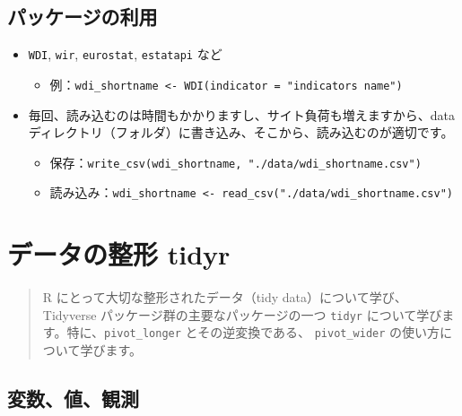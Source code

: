 \documentclass[
  xelatex, ja=standard]{bxjsbook}
\providecommand{\tightlist}{%
  \setlength{\itemsep}{0pt}\setlength{\parskip}{0pt}}
\theoremstyle{definition}
\theoremstyle{definition}
\theoremstyle{definition}
\theoremstyle{definition}
\theoremstyle{remark}
\begin{document}
\hypertarget{ux30d1ux30c3ux30b1ux30fcux30b8ux306eux5229ux7528}{%
\subsection{パッケージの利用}\label{ux30d1ux30c3ux30b1ux30fcux30b8ux306eux5229ux7528}}

\begin{itemize}
\tightlist
\item
  \texttt{WDI}, \texttt{wir}, \texttt{eurostat}, \texttt{estatapi} など

  \begin{itemize}
  \tightlist
  \item
    例：\texttt{wdi\_shortname\ \textless{}-\ WDI(indicator\ =\ "indicator\textquotesingle{}s\ name")}
  \end{itemize}
\item
  毎回、読み込むのは時間もかかりますし、サイト負荷も増えますから、data ディレクトリ（フォルダ）に書き込み、そこから、読み込むのが適切です。

  \begin{itemize}
  \tightlist
  \item
    保存：\texttt{write\_csv(wdi\_shortname,\ "./data/wdi\_shortname.csv")}
  \item
    読み込み：\texttt{wdi\_shortname\ \textless{}-\ read\_csv("./data/wdi\_shortname.csv")}
  \end{itemize}
\end{itemize}

\hypertarget{ux30c7ux30fcux30bfux306eux6574ux5f62-tidyr}{%
\section{データの整形 tidyr}\label{ux30c7ux30fcux30bfux306eux6574ux5f62-tidyr}}

\begin{quote}
R にとって大切な整形されたデータ（tidy data）について学び、Tidyverse パッケージ群の主要なパッケージの一つ \texttt{tidyr} について学びます。特に、\texttt{pivot\_longer} とその逆変換である、 \texttt{pivot\_wider} の使い方について学びます。
\end{quote}

\hypertarget{ux5909ux6570ux5024ux89b3ux6e2c}{%
\subsection{変数、値、観測}\label{ux5909ux6570ux5024ux89b3ux6e2c}}
\end{document}
